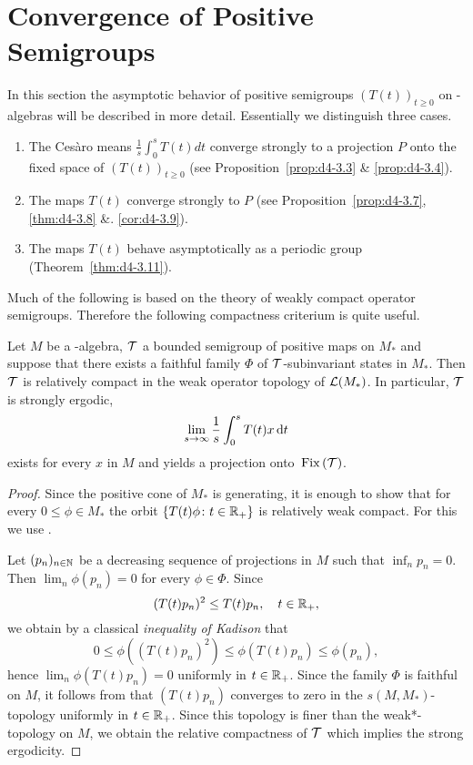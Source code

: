 \section{Convergence of Positive Semigroups}\label{sec:d4-3}
In this section the asymptotic behavior of positive semigroups $(T(t))_{t \geq 0}$ on \WA-algebras will be described in more detail.
Essentially we distinguish three cases.
\begin{enumerate}[\upshape (i)]
\item
The Cesàro means $\frac{1}{s}\int_{0}^{s} T(t)dt$ converge strongly to a projection $P$ onto the fixed space of $(T(t))_{t \geq 0}$ (see Proposition~\ref{prop:d4-3.3} \& \ref{prop:d4-3.4}).

\item
The maps $T(t)$ converge strongly to $P$ (see Proposition~\ref{prop:d4-3.7}, \ref{thm:d4-3.8} \&. \ref{cor:d4-3.9}).

\item
The maps $T(t)$ behave asymptotically as a periodic group (Theorem~\ref{thm:d4-3.11}).
\end{enumerate}
Much of the following is based on the theory of weakly compact operator semigroups.
Therefore the following compactness criterium is quite useful.
\begin{proposition}\label{prop:d4-3.1}
Let $M$ be a \WA-algebra, $\mathcal{T}$ a bounded semigroup of positive maps on $M_{*}$ and suppose that there exists a faithful family $\Phi$ of\/ $\mathcal{T}$-subinvariant states in $M_{*}$.
Then $\mathcal{T}$ is relatively compact in the weak operator topology of $ \mathcal{L}(M_{*}) $.
In particular, $\mathcal{T}$ is strongly ergodic, \ie 
%
\[
	\lim_{s \to \infty} \frac{1}{s}\int_{0}^{s} T(t)x \mathop{}\!\mathrm{d}{t}
\]
%
exists for every $x$ in $M$ and yields a projection onto $\mathop{}\mathrm{Fix}\left(\mathcal{T}\right)$.
\end{proposition}
%
\begin{proof}
Since the positive cone of $M_{*}$ is generating, it is enough to show that for every $0 \leq \phi \in M_{*}$ the orbit $\{T(t)\phi \colon t \in \mathbb{R}_{+}\}$ is relatively weak compact.
For this we use \citet[Theorem III.5.4.(iii)]{takesaki:1979}.

Let $(p_{n})_{n \in \mathbb{N}}$ be a decreasing sequence of projections in $M$ such that $\inf_{n} p_{n} = 0$.
Then $\lim_{n}\phi(p_{n}) = 0$ for every $\phi \in \Phi$.
Since
\[
	(T(t)p_{n})^2 \leq T(t)p_{n}, \quad t \in \mathbb{R}_{+},
\]
we obtain by a classical \emph{inequality of Kadison} that
\[
0 \leq \phi((T(t)p_{n})^2) \leq \phi(T(t)p_{n}) \leq \phi(p_{n}),
\]
hence $\lim_{n}\phi(T(t)p_{n}) = 0$ uniformly in $t \in \mathbb{R}_{+}$.
Since the family $\Phi$ is faithful on $M$, it follows from \citet[Proposition III.5.3]{takesaki:1979} that $(T(t)p_{n})$ converges to zero in the $s(M,M_{*})$-topology uniformly in $t \in \mathbb{R}_{+}$.
Since this topology is finer than the weak*-topology on $M$, we obtain the relative compactness of\/ $\mathcal{T}$ which implies the strong ergodicity.
\end{proof}
